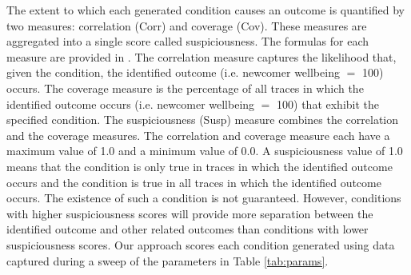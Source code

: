 \documentclass{scspaperproc}
\theoremstyle{scsthe}
\begin{document}
The extent to which each generated condition causes an outcome is quantified by two measures: correlation (Corr) and coverage (Cov). These measures are aggregated into a single score called suspiciousness. The formulas for each measure are provided in \cite{diallo2016formal}. The correlation measure captures the likelihood that, given the condition, the identified outcome (i.e. newcomer wellbeing $=$ 100) occurs. The coverage measure is the percentage of all traces in which the identified outcome occurs (i.e. newcomer wellbeing $=$ 100) that exhibit the specified condition. The suspiciousness (Susp) measure combines the correlation and the coverage measures. The correlation and coverage measure each have a maximum value of 1.0 and a minimum value of 0.0. A suspiciousness value of 1.0 means that the condition is only true in traces in which the identified outcome occurs and the condition is true in all traces in which the identified outcome occurs. The existence of such a condition is not guaranteed. However, conditions with higher suspiciousness scores will provide more separation between the identified outcome and other related outcomes than conditions with lower suspiciousness scores. Our approach scores each condition generated using data captured during a sweep of the parameters in Table \ref{tab:params}.
\end{document}
